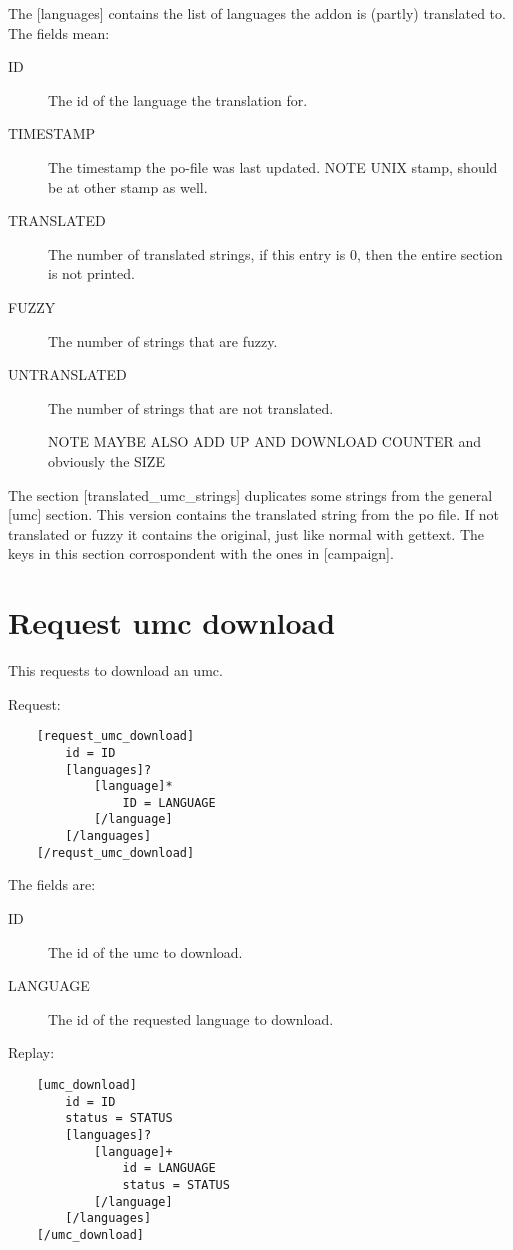 The [languages] contains the list of languages the addon is (partly)
translated to. The fields mean:
\begin{description}
\item[ID]
	The id of the language the translation for.

\item[TIMESTAMP]
	The timestamp the po-file was last updated. NOTE UNIX stamp, should be
	at other stamp as well.

\item[TRANSLATED]
	The number of translated strings, if this entry is $0$, then the entire
	section is not printed.

\item[FUZZY]
	The number of strings that are fuzzy.
	
\item[UNTRANSLATED]
	The number of strings that are not translated.

NOTE MAYBE ALSO ADD UP AND DOWNLOAD COUNTER and obviously the SIZE
\end{description}

The section [translated\_umc\_strings] duplicates some strings from the
general [umc] section. This version contains the translated string from
the po file. If not translated or fuzzy it contains the original, just like
normal with gettext. The keys in this section corrospondent with the ones in
[campaign].

\section{Request umc download}
\label{wire:request_umc_download}

This requests to download an umc.

Request:
\begin{lstlisting}
	[request_umc_download]
		id = ID
		[languages]?
			[language]*
				ID = LANGUAGE
			[/language]
		[/languages]
	[/requst_umc_download]
\end{lstlisting}

The fields are:
\begin{description}
\item[ID]
	The id of the umc to download.

\item[LANGUAGE]
	The id of the requested language to download.

\end{description}

Replay:
\begin{lstlisting}
	[umc_download]
		id = ID
		status = STATUS
		[languages]?
			[language]+
				id = LANGUAGE
				status = STATUS
			[/language]
		[/languages]
	[/umc_download]
\end{lstlisting}

